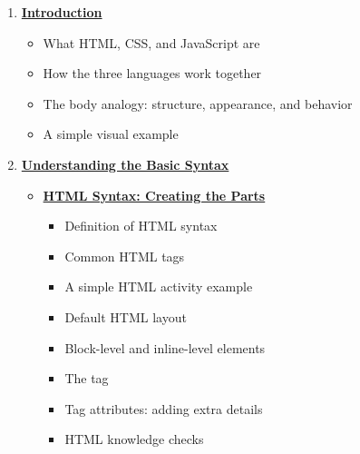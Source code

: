 \documentclass{article}
\begin{document}
\begin{enumerate}[leftmargin=1.2cm, itemsep=8pt]

  \item \hyperref[sec:introduction]{\textbf{\Bitter\textcolor{naranja}{Introduction}}}

        \begin{itemize}[leftmargin=0.8cm, itemsep=3pt]
          \item What HTML, CSS, and JavaScript are
          \item How the three languages work together
          \item The body analogy: structure, appearance, and behavior
          \item A simple visual example
        \end{itemize}

  \item \hyperref[sec:basic-syntax]{\textbf{\Bitter\textcolor{naranja}{Understanding the Basic Syntax}}}

        \begin{itemize}[leftmargin=0.8cm, itemsep=6pt]

          \item \hyperref[subsec:html-syntax]{\textbf{HTML Syntax: Creating the Parts}}
                \begin{itemize}[leftmargin=0.8cm, itemsep=3pt]
                  \item Definition of HTML syntax
                  \item Common HTML tags
                  \item A simple HTML activity example
                  \item Default HTML layout
                  \item Block-level and inline-level elements
                  \item The  tag
                  \item Tag attributes: adding extra details
                  \item HTML knowledge checks
                \end{itemize}


\end{itemize}
\end{enumerate}
\end{document}
